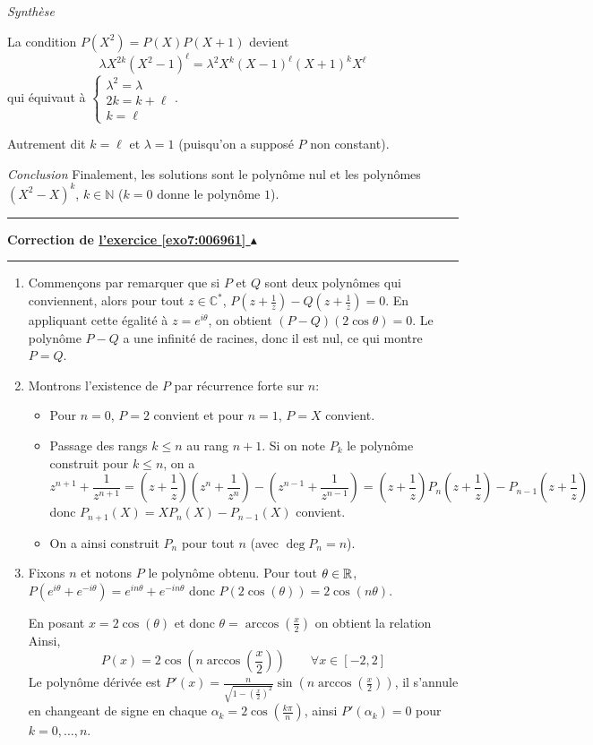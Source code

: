 \documentclass[11pt,a4paper]{article}
\newcommand{\Nn}{\mathbb{N}} \newcommand{\N}{\mathbb{N}}
\newcommand{\Cc}{\mathbb{C}} \newcommand{\C}{\mathbb{C}}
\renewcommand{\le}{\leqslant} \renewcommand{\leq}{\leqslant}
\newcommand{\Arccos}{\mathop{\mathrm{arccos}}\nolimits}
\newcounter{exo}
\newcommand{\correction}[1]{\hypertarget{cor7:#1}{}\label{cor7:#1}{\bf Correction de \hyperlink{exo7:#1}{l'exercice \ref{exo7:#1} $\blacktriangle$}}\vspace{1mm}\hrule\vspace{1mm}}
\newcommand{\fincorrection}{\vspace{1mm}\hrule\vspace*{7mm}}
\begin{document}
\bigskip

\emph{Synthèse}

La condition $P(X^2)=P(X)P(X+1)$ devient
$$\lambda X^{2k}(X^2-1)^\ell=\lambda^2X^k(X-1)^\ell(X+1)^kX^\ell$$
qui équivaut à $\left\{\begin{array}{l}\lambda^2=\lambda\\2k=k+\ell\\k=\ell\end{array}\right.$.

Autrement dit $k=\ell$ et $\lambda=1$ (puisqu'on a supposé $P$ non constant). 

{\it Conclusion}
Finalement, les solutions sont le polynôme nul et les polynômes $(X^2-X)^k$, 
$k\in\Nn$ ($k=0$ donne le polynôme $1$).
\fincorrection
\correction{006961}
\begin{enumerate}
  \item Commençons par remarquer que si $P$ et $Q$ sont deux polynômes 
  qui conviennent, alors pour tout $z\in\Cc^*$, 
$P\left(z+\frac{1}{z}\right)-Q\left(z+\frac{1}{z}\right)=0$. 
En appliquant cette égalité à $z=e^{i\theta}$, on obtient 
$(P-Q)(2\cos\theta)=0$. Le polynôme $P-Q$ a une infinité 
de racines, donc il est nul, ce qui montre $P=Q$.
  
  \item Montrons l'existence de $P$ par récurrence forte sur $n$:
  \begin{itemize}
    \item Pour $n=0$, $P=2$ convient et pour $n=1$, $P=X$ convient.
    
    \item Passage des rangs $k\le n$ au rang $n+1$. 
    Si on note $P_k$ le polynôme construit pour $k\le n$, on a 
$$z^{n+1}+\frac{1}{z^{n+1}}=(z+\frac{1}{z})(z^n+\frac{1}{z^n})-(z^{n-1}+\frac{1}{z^{n-1}})
=(z+\frac{1}{z})P_n(z+\frac{1}{z})-P_{n-1}(z+\frac{1}{z})$$
donc $P_{n+1}(X)=XP_n(X)-P_{n-1}(X)$ convient.

    \item On a ainsi construit $P_n$ pour tout $n$ (avec $\deg P_n =n$). 
  \end{itemize}

  \item Fixons $n$ et notons $P$ le polynôme obtenu.
  Pour tout $\theta\in\mathbb{R}$, $P(e^{i\theta}+e^{-i\theta})=e^{in\theta}+e^{-in\theta}$ 
  donc $P(2\cos(\theta))=2\cos(n\theta)$. 
  
  En posant $x=2\cos(\theta)$ et donc $\theta = \Arccos(\frac x2)$ on obtient la relation
  Ainsi,
$$P(x)=2\cos(n\Arccos(\frac x2)) \qquad \forall x\in[-2,2]$$
Le polynôme dérivée est $P'(x)=\frac{n}{\sqrt{1-(\frac{x}{2})^2}}\sin(n\Arccos(\frac x2))$, 
il s'annule en changeant de signe en chaque 
$\alpha_k = 2\cos(\frac{k\pi}{n})$, ainsi $P'(\alpha_k)=0$ pour $k = 0,\ldots,n$.


\end{enumerate}
\end{document}
